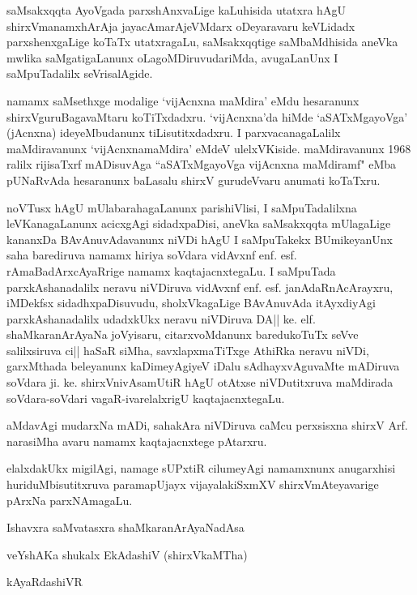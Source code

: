 saMsakxqqta AyoVgada parxshAnxvaLige kaLuhisida utatxra hAgU shirxVmanamxhArAja jayacAmarAjeVMdarx oDeyaravaru keVLidadx parxshenxgaLige koTaTx utatxragaLu, saMsakxqqtige saMbaMdhisida aneVka mwlika saMgatigaLanunx oLagoMDiruvudariMda, avugaLanUnx I saMpuTadalilx seVrisalAgide.

namamx saMsethxge modalige `vijAcnxna maMdira' eMdu hesaranunx shirxVguruBaga\break\-vaMtaru koTiTxdadxru. `vijAcnxna'da hiMde `aSATxMgayoVga' (jAcnxna) ideyeMbu\-danunx tiLisutitxdadxru. I parxvacanagaLalilx maMdira\-vanunx `vijAcnxnamaMdira' eMdeV ulelxVKiside. maMdiravanunx 1968 ralilx rijisaTxrf mADisuvAga ``aSATxMgayoVga vijAcnxna maMdiramf" eMba pUNaRvAda hesaranunx baLasalu shirxV gurudeVvaru anumati koTaTxru.

noVTusx hAgU mUlabarahagaLanunx parishiVlisi, I saMpuTadalilxna leVKana\-gaLanunx acicxgAgi sidadx\-paDisi, aneVka saMsakxqqta mUlagaLige kananxDa BAvAnuvAda\-vanunx niVDi hAgU I saMpuTakekx BUmike\-yanUnx saha barediruva namamx hiriya soVdara vidAvxnf enf. esf. rAmaBadArxcAyaRrige namamx kaqtajacnxtegaLu. I saMpuTada parxkAshanadalilx neravu niVDiruva vidAvxnf enf. esf. janAdaRnAcArayxru, iMDekfsx sidadhx\-paDisuvudu, sholxVkagaLige BAvAnuvAda itAyxdiyAgi parxkAshanadalilx udadxkUkx neravu niVDi\-ruva DA|| ke. elf. shaMkaranArAyaNa joVyisaru, citarxvoMdanunx baredukoTuTx seVve salilxsiruva ci|| haSaR siMha, savxlapxmaTiTxge AthiRka neravu niVDi, garxMthada beleyanunx kaDimeyAgiyeV iDalu sAdhayx\-vAguvaMte mADiruva soVdara ji. ke. shirxVnivAsamUtiR hAgU otAtxse niVDutitxruva maMdirada soVdara-\-soVdari vagaR-ivarelalxrigU kaqtajacnxtegaLu.

aMdavAgi mudarxNa mADi, sahakAra niVDiruva caMcu perxsisxna shirxV Arf. narasiMha avaru namamx kaqtajacnxtege pAtarxru.

elalxdakUkx migilAgi, namage sUPxtiR cilumeyAgi namamxnunx anugarxhisi huri\-duMbisutitxruva paramapUjayx vijayalakiSxmXV shirxVmAteyavarige pArxNa parxNAmagaLu.

\vskip 1cm

\noindent Ishavxra saMvatasxra \hfill shaMkaranArAyaNadAsa

\noindent veYshAKa shukalx EkAdashiV \hfill (shirxVkaMTha)

 \hfill kAyaRdashiVR


